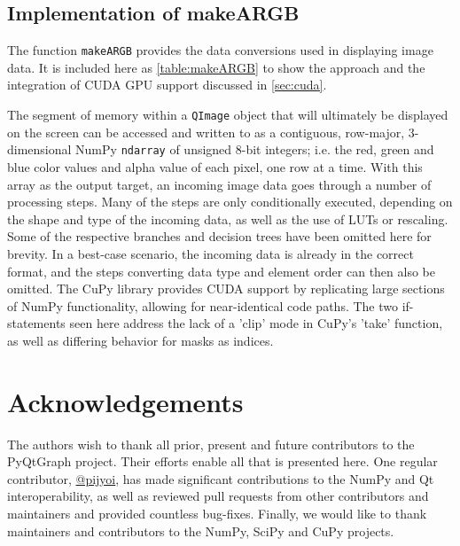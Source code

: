 \subsection{Implementation of makeARGB}
\label{app_makeARGB}

The function \texttt{makeARGB} provides the data conversions used in displaying image data. It is included here as \autoref{table:makeARGB} to show the approach and the integration of CUDA GPU support discussed in \autoref{sec:cuda}.

The segment of memory within a \texttt{QImage} object that will ultimately be displayed on the screen can be accessed and written to as a contiguous, row-major, 3-dimensional NumPy \texttt{ndarray} of unsigned 8-bit integers; i.e. the red, green and blue color values and alpha value of each pixel, one row at a time. With this array as the output target, an incoming image data goes through a number of processing steps. Many of the steps are only conditionally executed, depending on the shape and type of the incoming data, as well as the use of LUTs or rescaling. Some of the respective branches and decision trees have been omitted here for brevity. In a best-case scenario, the incoming data is already in the correct format, and the steps converting data type and element order can then also  be omitted. The CuPy library provides CUDA support by replicating large sections of NumPy functionality, allowing for near-identical code paths. The two if-statements seen here address the lack of a 'clip' mode in CuPy's 'take' function, as well as differing behavior for masks as indices.

\section{Acknowledgements}
The authors wish to thank all prior, present and future contributors to the PyQtGraph project. Their efforts enable all that is presented here. One regular contributor, \href{https://github.com/pijyoi}{@pijyoi}, has made significant contributions to the NumPy and Qt interoperability, as well as reviewed pull requests from other contributors and maintainers and provided countless bug-fixes. Finally, we would like to thank maintainers and contributors to the NumPy, SciPy and CuPy projects.
